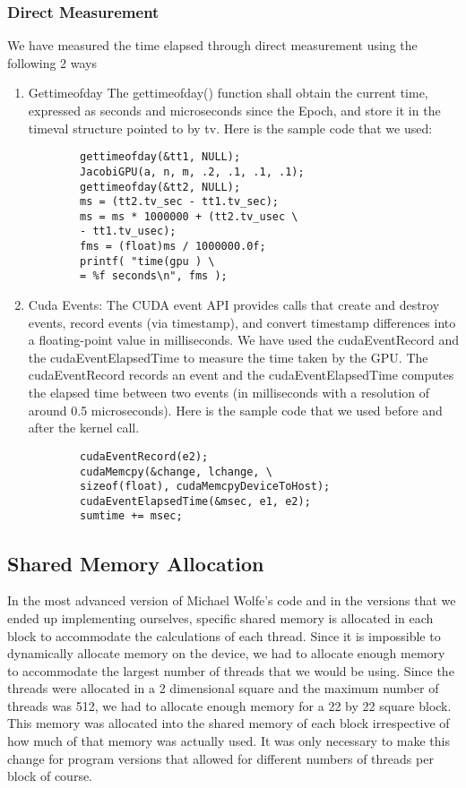 \documentclass[10pt]{article}
\begin{document}
\begin{multicols}{2}
  \subsubsection{Direct Measurement} 
  We have measured the time elapsed through direct measurement using the following 2 ways
  \begin{enumerate}
    \item{Gettimeofday}
      The gettimeofday() function shall obtain the current time, expressed as seconds and microseconds since the Epoch, and store it in the timeval structure pointed to by tv.
      Here is the sample code that we used:

      \begin{verbatim}
        gettimeofday(&tt1, NULL);
        JacobiGPU(a, n, m, .2, .1, .1, .1);
        gettimeofday(&tt2, NULL);
        ms = (tt2.tv_sec - tt1.tv_sec);
        ms = ms * 1000000 + (tt2.tv_usec \
        - tt1.tv_usec);
        fms = (float)ms / 1000000.0f;
        printf( "time(gpu ) \
        = %f seconds\n", fms );
      \end{verbatim}

    \item Cuda Events: The CUDA event API provides calls that create and destroy events, record events (via timestamp), and convert timestamp differences into a floating-point value in milliseconds.
      We have used the cudaEventRecord and the cudaEventElapsedTime to  measure the time taken by the GPU.
      The cudaEventRecord records an event and the cudaEventElapsedTime  computes the elapsed time between two events (in milliseconds with a resolution of around 0.5 microseconds).
      Here is the sample code that we used before and after the kernel call. 

      \begin{verbatim}
        cudaEventRecord(e2);
        cudaMemcpy(&change, lchange, \
        sizeof(float), cudaMemcpyDeviceToHost);
        cudaEventElapsedTime(&msec, e1, e2);
        sumtime += msec;
      \end{verbatim}

  \end{enumerate}

  \subsection{Shared Memory Allocation}%
  In the most advanced version of Michael Wolfe's code and in the versions that we ended up implementing ourselves, specific shared memory is allocated in each block to accommodate the calculations of each thread.
  Since it is impossible to dynamically allocate memory on the device, we had to allocate enough memory to accommodate the largest number of threads that we would be using.
  Since the threads were allocated in a 2 dimensional square and the maximum number of threads was 512, we had to allocate enough memory for a 22 by 22 square block.
  This memory was allocated into the shared memory of each block irrespective of how much of that memory was actually used.
  It was only necessary to make this change for program versions that allowed for different numbers of threads per block of course.


\end{multicols}
\end{document}

